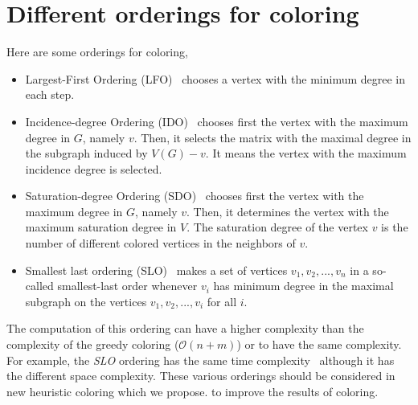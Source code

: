 \documentclass[12pt, twoside,a4paper,toc=bibliography]{scrbook}
\begin{document}
\chapter{Different orderings for coloring}
\label{app.ord}
Here are some orderings for coloring,
\begin{itemize}
\item Largest-First Ordering (LFO)~\cite{LFO} chooses a vertex with the minimum degree in each step.
\item Incidence-degree Ordering (IDO)~\cite{IDO} chooses first the vertex with the maximum degree in $G$, namely $v$. Then, it selects the matrix with the maximal degree in the subgraph induced by $V(G)-v$. It means the vertex with the maximum incidence degree is selected.
\item Saturation-degree Ordering (SDO)~\cite{SDO} chooses first the vertex with the maximum degree in $G$, namely $v$. Then, it determines the vertex with the maximum saturation degree in
$V$. The saturation degree of the vertex $v$ is the number of different colored vertices in the neighbors of $v$.
\item Smallest last ordering (SLO)~\cite{ordering1} makes a set of vertices ${v_1,v_2,...,v_n}$ in a so-called smallest-last
order whenever $v_i$ has minimum degree in the maximal subgraph on the vertices $v_1,v_2,...,v_i$ for all $i$.
\end{itemize}
The computation of this ordering can have a higher complexity than the complexity of the greedy coloring ($\mathcal{O}(n+m)$) or to have the same complexity. For example, the \textit{SLO} ordering has the same time complexity~\cite{ordering1} although it has the different space complexity. These various orderings should be considered in new heuristic coloring which we propose. to improve the results of coloring.

\end{document}

